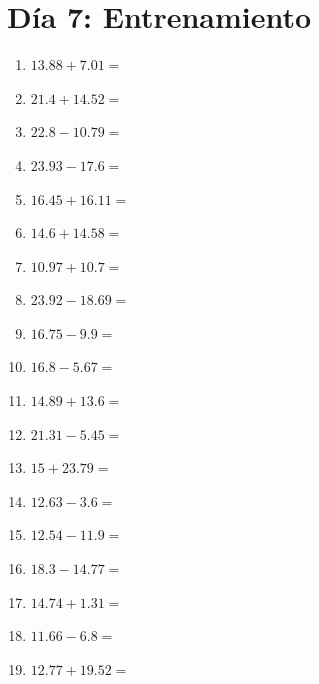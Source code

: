 \documentclass[12pt]{article}
\begin{document}
\section*{Día 7: Entrenamiento}
\begin{enumerate}
\item \large $ 13.88 + 7.01 = $ \vspace{1.5cm}
\item \large $ 21.4 + 14.52 = $ \vspace{1.5cm}
\item \large $ 22.8 - 10.79 = $ \vspace{1.5cm}
\item \large $ 23.93 - 17.6 = $ \vspace{1.5cm}
\item \large $ 16.45 + 16.11 = $ \vspace{1.5cm}
\item \large $ 14.6 + 14.58 = $ \vspace{1.5cm}
\item \large $ 10.97 + 10.7 = $ \vspace{1.5cm}
\item \large $ 23.92 - 18.69 = $ \vspace{1.5cm}
\item \large $ 16.75 - 9.9 = $ \vspace{1.5cm}
\item \large $ 16.8 - 5.67 = $ \vspace{1.5cm}
\newpage
\item \large $ 14.89 + 13.6 = $ \vspace{1.5cm}
\item \large $ 21.31 - 5.45 = $ \vspace{1.5cm}
\item \large $ 15 + 23.79 = $ \vspace{1.5cm}
\item \large $ 12.63 - 3.6 = $ \vspace{1.5cm}
\item \large $ 12.54 - 11.9 = $ \vspace{1.5cm}
\item \large $ 18.3 - 14.77 = $ \vspace{1.5cm}
\item \large $ 14.74 + 1.31 = $ \vspace{1.5cm}
\item \large $ 11.66 - 6.8 = $ \vspace{1.5cm}
\item \large $ 12.77 + 19.52 = $ \vspace{1.5cm}

\end{enumerate}
\end{document}
